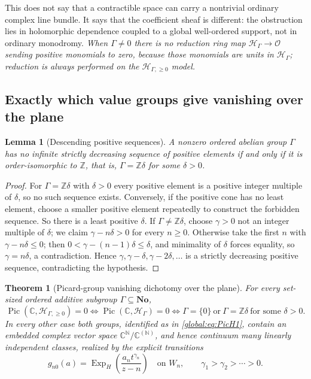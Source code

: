 \documentclass[11pt,letterpaper]{article}
\newtheorem{theorem}{Theorem}[section]
\newtheorem{lemma}[lemma]{Lemma}
\theoremstyle{definition}
\theoremstyle{remark}
\newcommand{\No}{\mathbf{No}}
\newcommand{\C}{\mathbb C}
\newcommand{\N}{\mathbb N}
\newcommand{\Z}{\mathbb Z}
\newcommand{\OO}{\mathcal O}
\newcommand{\HH}{\mathscr H_\Gamma}
\newcommand{\HI}{\mathscr H_{\Gamma,\ge0}}
\newcommand{\Pic}{\operatorname{Pic}}
\newcommand{\ExpH}{\operatorname{Exp}_{H}}
\numberwithin{equation}{section}
\begin{document}
This does not say that a contractible space can carry a nontrivial ordinary complex line bundle. It says that the coefficient sheaf is different: the obstruction lies in holomorphic dependence coupled to a global well-ordered support, not in ordinary monodromy. \emph{When $\Gamma\ne0$ there is no reduction ring map $\HH\to\OO$ sending positive monomials to zero, because those monomials are units in $\HH$; reduction is always performed on the $\HI$ model.}

\subsection{Exactly which value groups give vanishing over the plane}

\begin{lemma}[Descending positive sequences]\label{global:lem:descending}
A nonzero ordered abelian group $\Gamma$ has no infinite strictly decreasing sequence of positive elements if and only if it is order-isomorphic to $\Z$, that is, $\Gamma=\Z\delta$ for some $\delta>0$.
\end{lemma}

\begin{proof}
For $\Gamma=\Z\delta$ with $\delta>0$ every positive element is a positive integer multiple of $\delta$, so no such sequence exists. Conversely, if the positive cone has no least element, choose a smaller positive element repeatedly to construct the forbidden sequence. So there is a least positive $\delta$. If $\Gamma\ne\Z\delta$, choose $\gamma>0$ not an integer multiple of $\delta$; we claim $\gamma-n\delta>0$ for every $n\ge0$. Otherwise take the first $n$ with $\gamma-n\delta\le0$; then $0<\gamma-(n-1)\delta\le\delta$, and minimality of $\delta$ forces equality, so $\gamma=n\delta$, a contradiction. Hence $\gamma,\gamma-\delta,\gamma-2\delta,\dots$ is a strictly decreasing positive sequence, contradicting the hypothesis.
\end{proof}

\begin{theorem}[Picard-group vanishing dichotomy over the plane]\label{global:thm:dichotomy}
For every set-sized ordered additive subgroup $\Gamma\subseteq\No$,
\begin{equation}\label{global:eq:dichotomy}
  \Pic(\C,\HI)=0
  \iff
  \Pic(\C,\HH)=0
  \iff
  \Gamma=\{0\}\ \text{or}\ \Gamma=\Z\delta\ \text{for some }\delta>0 .
\end{equation}
In every other case both groups, identified as in \eqref{global:eq:PicH1}, contain an embedded complex vector space $\C^\N/\C^{(\N)}$, and hence continuum many linearly independent classes, realized by the explicit transitions
\begin{equation}\label{global:eq:explicitbundles}
  g_{n0}(a)=\ExpH\!\left(\frac{a_nt^{\gamma_n}}{z-n}\right)
  \quad\text{on }W_n,
  \qquad \gamma_1>\gamma_2>\cdots>0 .
\end{equation}
\end{theorem}
\end{document}

